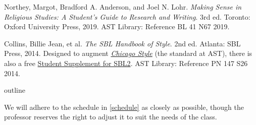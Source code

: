 \documentclass[titlepage]{article}
\begin{document}
\begingroup
\renewcommand{\section}[2]{}%
\begin{thebibliography}{RLGS}%

	 Northey, Margot, Bradford A. Anderson, and Joel N. Lohr.
	\emph{Making Sense in Religious Studies: A Student's Guide to Research and Writing}.
	3rd ed. Toronto: Oxford University Press, 2019. AST Library: Reference BL 41 N67 2019.

	 Collins, Billie Jean, et al.
	\emph{The SBL Handbook of Style}.
	2nd ed. Atlanta: SBL Press, 2014.
	Designed to augment \href{https://proxy.openathens.net/login?qurl=https%3A%2F%2Fwww.chicagomanualofstyle.org%2Fbook%2Fed17%2Ffrontmatter%2Ftoc.html}{\emph{Chicago Style}}
	(the standard at AST), there is also a free
	\href{https://www.sbl-site.org/assets/pdfs/pubs/SBLHSsupp2015-02.pdf}{Student Supplement for SBL2}. AST Library: Reference PN 147 S26 2014.

\end{thebibliography}
\endgroup

\section{Course Outline}
\label{outline}

We will adhere to the schedule in \autoref{schedule} as closely as
possible, though the professor reserves the right to adjust it to suit
the needs of the class.
\end{document}
